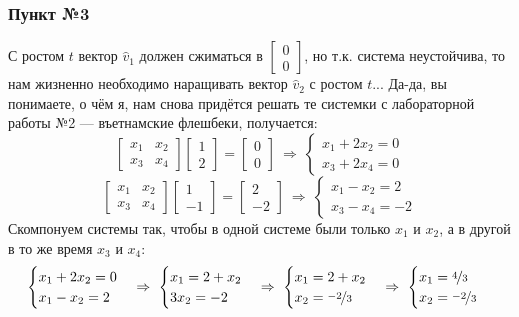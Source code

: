 \documentclass[a3paper,14pt]{extarticle}
\begin{document}
\subsubsection*{Пункт №3}
С ростом $t$ вектор $\hat{v}_1$ должен сжиматься в $\left[\begin{smallmatrix}
    0 \\ 0
\end{smallmatrix}\right]$, но т.к. система неустойчива, то нам жизненно необходимо наращивать вектор $\hat{v}_2$ с ростом $t$... Да-да, вы понимаете, о чём я, нам снова придётся решать те системки с лабораторной работы №2 --- въетнамские флешбеки, получается:
$$\begin{bmatrix}
    x_1 & x_2 \\ x_3 & x_4
\end{bmatrix}\begin{bmatrix}
    1 \\ 2
\end{bmatrix} = \begin{bmatrix}
    0 \\ 0
\end{bmatrix} \  \Rightarrow \ \begin{cases}
    x_1 + 2x_2 = 0 \\ x_3 + 2x_4 = 0
\end{cases}$$
$$\begin{bmatrix}
    x_1 & x_2 \\ x_3 & x_4
\end{bmatrix}\begin{bmatrix}
    1 \\ -1
\end{bmatrix} = \begin{bmatrix}
    2 \\ -2
\end{bmatrix} \ \Rightarrow \ \begin{cases}
    x_1 - x_2 = 2 \\ x_3 - x_4 = -2
\end{cases}$$
Скомпонуем системы так, чтобы в одной системе были только $x_1$ и $x_2$, а в другой в то же время $x_3$ и $x_4$:
$$\begin{cases}
    x_1 + 2x_2 = 0 \\ x_1 - x_2 = 2
\end{cases} \Rightarrow\ \begin{cases}
    x_1 = 2 + x_2 \\ 3x_2 = -2
\end{cases} \Rightarrow\ \begin{cases}
    x_1 = 2 + x_2 \\ x_2 = \nicefrac{-2}{3}
\end{cases} \Rightarrow\ \begin{cases}
    x_1 = \nicefrac{4}{3} \\ x_2 = \nicefrac{-2}{3}
\end{cases}$$
\end{document}

